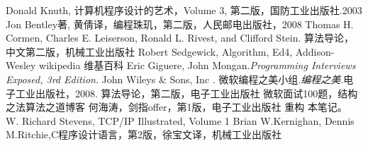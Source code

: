 \documentclass[11pt,a4paper]{report}
\begin{document}
\begin{thebibliography}{99}
     Donald Knuth, 计算机程序设计的艺术，Volume 3, 第二版，国防工业出版社.2003
     Jon Bentley著, 黄倩译，编程珠玑，第二版，人民邮电出版社，2008
     Thomas H. Cormen, Charles E. Leiserson, Ronald L. Rivest, and Clifford Stein. 算法导论，中文第二版，机械工业出版社
     Robert Sedgewick, Algorithm, Ed4, Addison-Wesley
    wikipedia 
     维基百科
     Eric Giguere, John Mongan.\emph{Programming Interviews Exposed, 3rd Edition}. John Wileys \& Sons, Inc .
     微软编程之美小组.\emph{编程之美}.电子工业出版社，2008.
     算法导论，第二版，电子工业出版社
    微软面试100题，结构之法算法之道博客
    何海涛，剑指offer，第1版，电子工业出版社
    重构
    本笔记。
    W. Richard Stevens, TCP/IP Illustrated, Volume 1
    Brian W.Kernighan, Dennis M.Ritchie,C程序设计语言，第2版，徐宝文译，机械工业出版社

\end{thebibliography}
\end{document}
